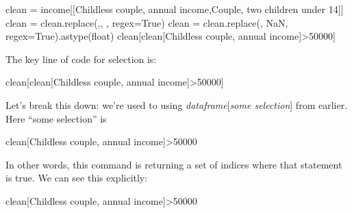 \documentclass[
  letterpaper,
  DIV=11,
  numbers=noendperiod]{scrreprt}
\newenvironment{Shaded}{\begin{snugshade}}{\end{snugshade}}
\newcommand{\DecValTok}[1]{\textcolor[rgb]{0.68,0.00,0.00}{#1}}
\newcommand{\NormalTok}[1]{\textcolor[rgb]{0.00,0.23,0.31}{#1}}
\newcommand{\OperatorTok}[1]{\textcolor[rgb]{0.37,0.37,0.37}{#1}}
\newcommand{\StringTok}[1]{\textcolor[rgb]{0.13,0.47,0.30}{#1}}
\newcommand{\VariableTok}[1]{\textcolor[rgb]{0.07,0.07,0.07}{#1}}
\begin{document}
\begin{Shaded}
\begin{Highlighting}[]
\NormalTok{clean }\OperatorTok{=}\NormalTok{ income[[}\StringTok{\textquotesingle{}Childless couple, annual income\textquotesingle{}}\NormalTok{,}\StringTok{\textquotesingle{}Couple, two children under 14\textquotesingle{}}\NormalTok{]]}
\NormalTok{clean }\OperatorTok{=}\NormalTok{ clean.replace(}\StringTok{\textquotesingle{},\textquotesingle{}}\NormalTok{, }\StringTok{\textquotesingle{}\textquotesingle{}}\NormalTok{, regex}\OperatorTok{=}\VariableTok{True}\NormalTok{)}
\NormalTok{clean }\OperatorTok{=}\NormalTok{ clean.replace(}\StringTok{\textquotesingle{}{-}\textquotesingle{}}\NormalTok{, }\StringTok{\textquotesingle{}NaN\textquotesingle{}}\NormalTok{, regex}\OperatorTok{=}\VariableTok{True}\NormalTok{).astype(}\StringTok{\textquotesingle{}float\textquotesingle{}}\NormalTok{)}
\NormalTok{clean[clean[}\StringTok{\textquotesingle{}Childless couple, annual income\textquotesingle{}}\NormalTok{]}\OperatorTok{\textgreater{}}\DecValTok{50000}\NormalTok{]}
\end{Highlighting}
\end{Shaded}

The key line of code for selection is:

\begin{Shaded}
\begin{Highlighting}[]
\NormalTok{clean[clean[}\StringTok{\textquotesingle{}Childless couple, annual income\textquotesingle{}}\NormalTok{]}\OperatorTok{\textgreater{}}\DecValTok{50000}\NormalTok{]}
\end{Highlighting}
\end{Shaded}

Let's break this down: we're used to using \emph{dataframe}{[}\emph{some
selection}{]} from earlier. Here ``some selection'' is

\begin{Shaded}
\begin{Highlighting}[]
\NormalTok{clean[}\StringTok{\textquotesingle{}Childless couple, annual income\textquotesingle{}}\NormalTok{]}\OperatorTok{\textgreater{}}\DecValTok{50000}
\end{Highlighting}
\end{Shaded}

In other words, this command is returning a set of indices where that
statement is true. We can see this explicitly:

\begin{Shaded}
\begin{Highlighting}[]
\NormalTok{clean[}\StringTok{\textquotesingle{}Childless couple, annual income\textquotesingle{}}\NormalTok{]}\OperatorTok{\textgreater{}}\DecValTok{50000}
\end{Highlighting}
\end{Shaded}
\end{document}
